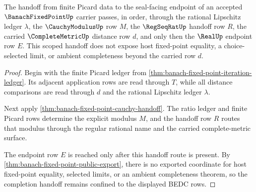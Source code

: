 \begin{theorem}
\label{thm:banach-fixed-point-completion-handoff-scope}
The handoff from finite Picard data to the seal-facing endpoint of an accepted $\BanachFixedPointUp$ carrier passes, in order, through the rational Lipschitz ledger $\lambda$, the $\CauchyModulusUp$ row $M$, the $\RegSeqRatUp$ handoff row $R$, the carried $\CompleteMetricUp$ distance row $d$, and only then the $\RealUp$ endpoint row $E$. This scoped handoff does not expose host fixed-point equality, a choice-selected limit, or ambient completeness beyond the carried row $d$.
\end{theorem}
\begin{proof}
Begin with the finite Picard ledger from \autoref{thm:banach-fixed-point-iteration-ledger}. Its adjacent application rows are read through $T$, while all distance comparisons are read through $d$ and the rational Lipschitz ledger $\lambda$.

Next apply \autoref{thm:banach-fixed-point-cauchy-handoff}. The ratio ledger and finite Picard rows determine the explicit modulus $M$, and the handoff row $R$ routes that modulus through the regular rational name and the carried complete-metric surface.

The endpoint row $E$ is reached only after this handoff route is present. By \autoref{thm:banach-fixed-point-public-export}, there is no exported coordinate for host fixed-point equality, selected limits, or an ambient completeness theorem, so the completion handoff remains confined to the displayed BEDC rows.
\end{proof}

